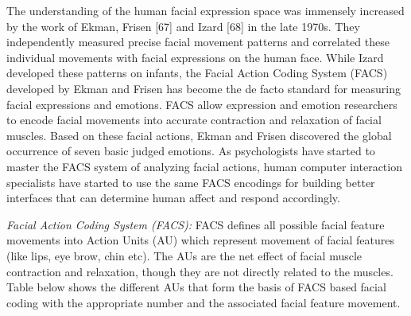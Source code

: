 \documentclass[oneside,11pt]{memoir}
\begin{document}
The understanding of the human facial expression space was immensely increased by the work of Ekman, Frisen [67] and Izard [68] in the late 1970s. They independently measured precise facial movement patterns and correlated these individual movements with facial expressions on the human face. While Izard developed these patterns on infants, the Facial Action Coding System (FACS) developed by Ekman and Frisen has become the de facto standard for measuring facial expressions and emotions. FACS allow expression and emotion researchers to encode facial movements into accurate contraction and relaxation of facial muscles. Based on these facial actions, Ekman and Frisen discovered the global occurrence of seven basic judged emotions. As psychologists have started to master the FACS system of analyzing facial actions, human computer interaction specialists have started to use the same FACS encodings for building better interfaces that can determine human affect and respond accordingly.

\emph{Facial Action Coding System (FACS):}
FACS defines all possible facial feature movements into Action Units (AU) which represent movement of facial features (like lips, eye brow, chin etc). The AUs are the net effect of facial muscle contraction and relaxation, though they are not directly related to the muscles. Table below shows the different AUs that form the basis of FACS based facial coding with the appropriate number and the associated facial feature movement.
\end{document}
